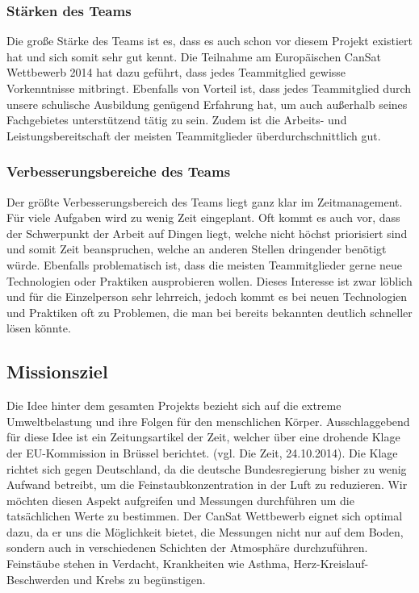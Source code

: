 \subsubsection{Stärken des Teams}
Die große Stärke des Teams ist es, dass es auch schon vor diesem Projekt existiert hat und sich somit sehr gut kennt. Die Teilnahme am Europäischen CanSat Wettbewerb 2014 hat dazu geführt, dass jedes Teammitglied gewisse Vorkenntnisse mitbringt. Ebenfalls von Vorteil ist, dass jedes Teammitglied durch unsere schulische Ausbildung genügend Erfahrung hat, um auch außerhalb seines Fachgebietes unterstützend tätig zu sein. Zudem ist die Arbeits- und Leistungsbereitschaft der meisten Teammitglieder überdurchschnittlich gut.

\subsubsection{Verbesserungsbereiche des Teams}
Der größte Verbesserungsbereich des Teams liegt ganz klar im Zeitmanagement. Für viele Aufgaben wird zu wenig Zeit eingeplant. Oft kommt es auch vor, dass der Schwerpunkt der Arbeit auf Dingen liegt, welche nicht höchst priorisiert sind und somit Zeit beanspruchen, welche an anderen Stellen dringender benötigt würde. Ebenfalls problematisch ist, dass die meisten Teammitglieder gerne neue Technologien oder Praktiken ausprobieren wollen. Dieses Interesse ist zwar löblich und für die Einzelperson sehr lehrreich, jedoch kommt es bei neuen Technologien und Praktiken oft zu Problemen, die man bei bereits bekannten deutlich schneller lösen könnte.

\subsection{Missionsziel}
Die Idee hinter dem gesamten Projekts bezieht sich auf die extreme Umweltbelastung und ihre Folgen für den menschlichen Körper. Ausschlaggebend für diese Idee ist ein Zeitungsartikel der Zeit, welcher über eine drohende Klage der EU-Kommission in Brüssel berichtet. (vgl. Die Zeit, 24.10.2014). Die Klage richtet sich gegen Deutschland, da die deutsche Bundesregierung bisher zu wenig Aufwand betreibt, um die Feinstaubkonzentration in der Luft zu reduzieren. Wir möchten diesen Aspekt aufgreifen und Messungen durchführen um die tatsächlichen Werte zu bestimmen. Der CanSat Wettbewerb eignet sich optimal dazu, da er uns die Möglichkeit bietet, die Messungen nicht nur auf dem Boden, sondern auch in verschiedenen Schichten der Atmosphäre durchzuführen. Feinstäube stehen in Verdacht, Krankheiten wie Asthma, Herz-Kreislauf-Beschwerden und Krebs zu begünstigen.

